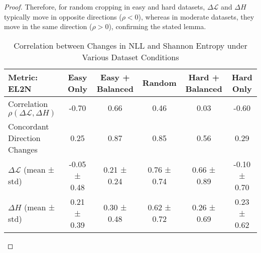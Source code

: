 \begin{proof}
Therefore, for random cropping in easy and hard datasets, 
\(\Delta\mathcal{L}\) and \(\Delta H\) typically move in opposite 
directions (\(\rho<0\)), whereas in moderate datasets, they move in 
the same direction (\(\rho>0\)), confirming the stated lemma.


\begin{table}[H]
\centering
\caption{Correlation between Changes in NLL and Shannon Entropy under Various Dataset Conditions}
\label{tab:my-table}
\begin{tabular}{@{}lccccc@{}}
\toprule
\textbf{Metric: EL2N~\cite{paul2021deep}} & \textbf{Easy Only} & \textbf{Easy + Balanced} & \textbf{Random} & \textbf{Hard + Balanced} & \textbf{Hard Only} \\ \midrule
Correlation \(\rho(\Delta\mathcal{L}, \Delta H)\)  & -0.70 & 0.66 & 0.46 & 0.03 & -0.60 \\
Concordant Direction Changes          & 0.25 & 0.87 & 0.85 & 0.56 & 0.29 \\
\(\Delta\mathcal{L}\) (mean ± std)                  & -0.05 ± 0.48 & 0.21 ± 0.24 & 0.76 ± 0.74 & 0.66 ± 0.89 & -0.10 ± 0.70 \\ 
\(\Delta H\) (mean ± std)                           & 0.21 ± 0.39 & 0.30 ± 0.48 & 0.62 ± 0.72 & 0.26 ± 0.69 & 0.23 ± 0.62 \\\bottomrule
\end{tabular}
\end{table}

\end{proof}

